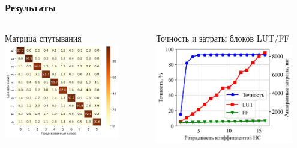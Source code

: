 \begin{frame}[t]
\frametitle{Результаты}
\begin{columns}
\begin{block}{ \centering Матрица спутывания}
    \vspace{3mm}
    \includegraphics[width = 0.815\textwidth]{pics/cm_6q5.jpg} 
\end{block}
 
\begin{block}{\centering Точность и затраты блоков LUT/FF}
    \vspace{3mm}
    \includegraphics[width = 0.9\textwidth]{pics/Acc_LUTs_FFs.jpg} 
\end{block}

\end{columns}
\end{frame}

